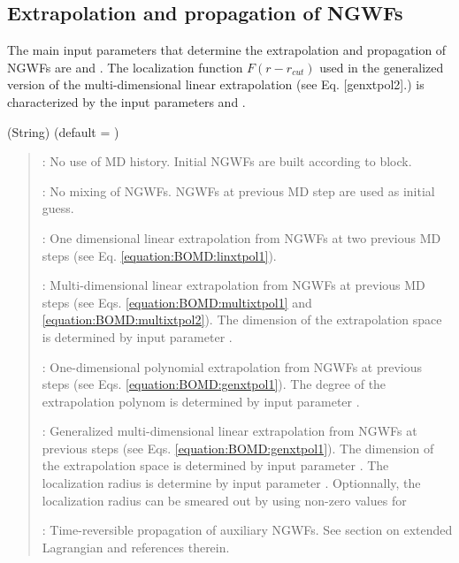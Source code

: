 \documentclass[letterpaper,10pt,english]{sphinxmanual}
\begin{document}
\subsection{Extrapolation and propagation of NGWFs}
\label{\detokenize{BOMD:extrapolation-and-propagation-of-ngwfs}}
The main input parameters that
determine the extrapolation and propagation of NGWFs are
 and . The localization function
\(F(r-r_{cut})\) used in the generalized version of the
multi-dimensional linear extrapolation (see Eq. {[}genxtpol2{]}.) is
characterized by the input parameters  and
.

 (String) (default = )
\begin{quote}

\begin{DUlineblock}{0em}
\item[]  : No use of MD history. Initial NGWFs are built according to  block.
\item[]  : No mixing of NGWFs. NGWFs at previous MD step are used as initial guess.
\item[]  : One dimensional linear extrapolation from NGWFs at two previous MD steps (see Eq. \eqref{equation:BOMD:linxtpol1}).
\item[]  : Multi-dimensional linear extrapolation from NGWFs at previous MD steps (see Eqs. \eqref{equation:BOMD:multixtpol1} and \eqref{equation:BOMD:multixtpol2}). The dimension of the extrapolation space is determined by input parameter .
\item[]  : One-dimensional polynomial extrapolation from NGWFs at previous steps (see Eqs. \eqref{equation:BOMD:genxtpol1}). The degree of the extrapolation   polynom is determined by input parameter .
\item[]  : Generalized multi-dimensional linear extrapolation from NGWFs at previous steps (see Eqs. \eqref{equation:BOMD:genxtpol1}). The dimension of the extrapolation space is determined by input parameter . The localization radius is determine by input parameter . Optionnally, the localization radius can be smeared out by using non-zero values for 
\item[]  : Time-reversible propagation of auxiliary NGWFs. See section on extended Lagrangian and references therein.
\end{DUlineblock}
\end{quote}
\end{document}
